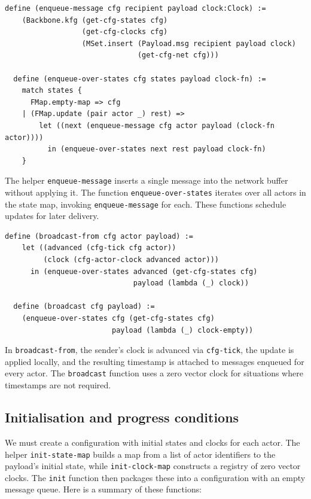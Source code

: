 \begin{lstlisting}[language=Athena,style=athena]
  define (enqueue-message cfg recipient payload clock:Clock) :=
    (Backbone.kfg (get-cfg-states cfg)
                  (get-cfg-clocks cfg)
                  (MSet.insert (Payload.msg recipient payload clock)
                               (get-cfg-net cfg)))

  define (enqueue-over-states cfg states payload clock-fn) :=
    match states {
      FMap.empty-map => cfg
    | (FMap.update (pair actor _) rest) =>
        let ((next (enqueue-message cfg actor payload (clock-fn actor))))
          in (enqueue-over-states next rest payload clock-fn)
    }
\end{lstlisting}

The helper \lstinline{enqueue-message} inserts a single message into the network buffer without applying it.  The function \lstinline{enqueue-over-states} iterates over all actors in the state map, invoking \lstinline{enqueue-message} for each.  These functions schedule updates for later delivery.

\begin{lstlisting}[language=Athena,style=athena]
  define (broadcast-from cfg actor payload) :=
    let ((advanced (cfg-tick cfg actor))
         (clock (cfg-actor-clock advanced actor)))
      in (enqueue-over-states advanced (get-cfg-states cfg)
                              payload (lambda (_) clock))

  define (broadcast cfg payload) :=
    (enqueue-over-states cfg (get-cfg-states cfg)
                         payload (lambda (_) clock-empty))
\end{lstlisting}

In \lstinline{broadcast-from}, the sender’s clock is advanced via \lstinline{cfg-tick}, the update is applied locally, and the resulting timestamp is attached to messages enqueued for every actor.  The \lstinline{broadcast} function uses a zero vector clock for situations where timestamps are not required.

\subsection{Initialisation and progress conditions}

We must create a configuration with initial states and clocks for each actor.  The helper \lstinline{init-state-map} builds a map from a list of actor identifiers to the payload’s initial state, while \lstinline{init-clock-map} constructs a registry of zero vector clocks.  The \lstinline{init} function then packages these into a configuration with an empty message queue. Here is a summary of these functions:

